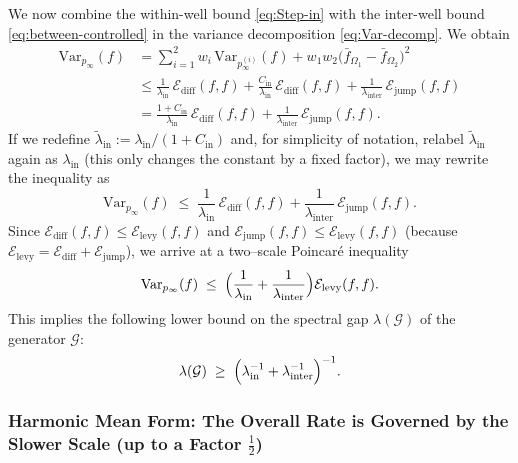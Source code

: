We now combine the within-well bound \eqref{eq:Step-in} with the inter-well
bound \eqref{eq:between-controlled} in the variance decomposition
\eqref{eq:Var-decomp}.
We obtain
\begin{align*}
\mathrm{Var}_{p_\infty}(f)
&=
\sum_{i=1}^2 w_i\,\mathrm{Var}_{p_\infty^{(i)}}(f)
+
w_1w_2\bigl(\bar f_{\Omega_1}-\bar f_{\Omega_2}\bigr)^2
\\
&\le
\frac{1}{\lambda_{\mathrm{in}}}\,\mathcal E_{\mathrm{diff}}(f,f)
+
\frac{C_{\mathrm{in}}}{\lambda_{\mathrm{in}}}\,
\mathcal E_{\mathrm{diff}}(f,f)
+
\frac{1}{\lambda_{\mathrm{inter}}}\,
\mathcal E_{\mathrm{jump}}(f,f)
\\
&=
\frac{1+C_{\mathrm{in}}}{\lambda_{\mathrm{in}}}\,\mathcal E_{\mathrm{diff}}(f,f)
+
\frac{1}{\lambda_{\mathrm{inter}}}\,
\mathcal E_{\mathrm{jump}}(f,f).
\end{align*}
If we redefine
\(
\tilde\lambda_{\mathrm{in}}:=\lambda_{\mathrm{in}}/(1+C_{\mathrm{in}})
\)
and, for simplicity of notation, relabel \(\tilde\lambda_{\mathrm{in}}\) again
as \(\lambda_{\mathrm{in}}\) (this only changes the constant by a fixed factor),
we may rewrite the inequality as
\[
\mathrm{Var}_{p_\infty}(f)
\;\le\;
\frac{1}{\lambda_{\mathrm{in}}}\,\mathcal E_{\mathrm{diff}}(f,f)
+
\frac{1}{\lambda_{\mathrm{inter}}}\,\mathcal E_{\mathrm{jump}}(f,f).
\]
Since
\(
\mathcal E_{\mathrm{diff}}(f,f)\le\mathcal E_{\mathrm{levy}}(f,f)
\)
and
\(
\mathcal E_{\mathrm{jump}}(f,f)\le\mathcal E_{\mathrm{levy}}(f,f)
\)
(because \(\mathcal E_{\mathrm{levy}}=\mathcal E_{\mathrm{diff}}+\mathcal E_{\mathrm{jump}}\)),
we arrive at a two–scale Poincaré inequality
\begin{equation}\label{eq:two-scale-PI}
\mathrm{Var}_{p_\infty}(f)
\;\le\;
\Bigl(\frac{1}{\lambda_{\mathrm{in}}}+\frac{1}{\lambda_{\mathrm{inter}}}\Bigr)
\mathcal E_{\mathrm{levy}}(f,f).
\end{equation}
This implies the following lower bound on the spectral gap \(\lambda(\mathcal G)\)
of the generator \(\mathcal G\):
\begin{equation}\label{eq:harmonic}
\lambda(\mathcal G)
\;\ge\;
\Bigl(\lambda_{\mathrm{in}}^{-1}+\lambda_{\mathrm{inter}}^{-1}\Bigr)^{-1}.
\end{equation}

\subsubsection{Harmonic Mean Form: The Overall Rate is Governed by the Slower Scale (up to a Factor \texorpdfstring{$\tfrac12$}{1/2})}


